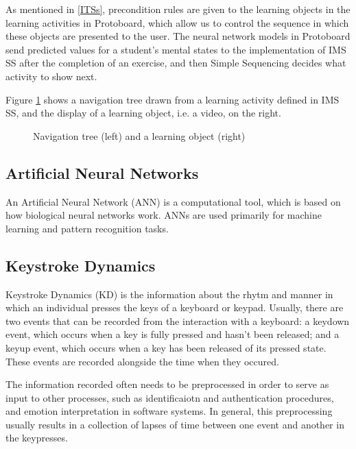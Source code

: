 \documentclass{acm_proc_article-sp}
\begin{document}
As mentioned in \ref{ITSs}, precondition rules are given to the
learning objects in the learning activities in Protoboard, which allow
us to control the sequence in which these objects are presented to the
user. The neural network models in Protoboard send predicted values
for a student's mental states to the implementation of IMS SS after the
completion of an exercise, and then Simple Sequencing decides what
activity to show next.

Figure \ref{fig:navigation-tree} shows a navigation tree drawn from a
learning activity defined in IMS SS, and the display of a learning
object, i.e. a video, on the right.

\begin{figure}
  \centering
  \caption{Navigation tree (left) and a learning object (right)}
  \label{fig:navigation-tree}
\end{figure}


\subsection{Artificial Neural Networks}
\label{ANN}

An Artificial Neural Network (ANN) is a computational tool, which is based
on how biological neural networks work. ANNs are used primarily for
machine learning and pattern recognition tasks.


\subsection{Keystroke Dynamics}
\label{KD}

Keystroke Dynamics (KD) is the information about the rhytm and manner
in which an individual presses the keys of a keyboard or
keypad. Usually, there are two events that can be recorded from the
interaction with a keyboard: a keydown event, which occurs when a key
is fully pressed and hasn't been released; and a keyup event, which
occurs when a key has been released of its pressed state. These events
are recorded alongside the time when they occured.

The information recorded often needs to be preprocessed in order to
serve as input to other processes, such as identificaiotn and
authentication procedures, and emotion interpretation in software
systems. In general, this preprocessing usually results in a
collection of lapses of time between one event and another in the
keypresses.
\end{document}
